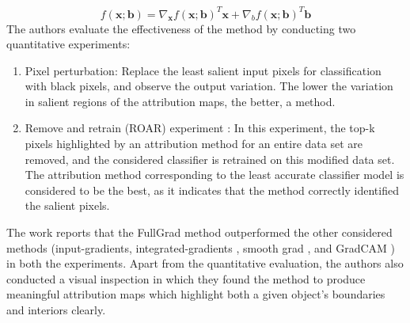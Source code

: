 \documentclass[../report.tex]{subfiles}
\begin{document}
\begin{equation*}
	f(\mathbf{x} ; \mathbf{b})=\nabla_{\mathbf{x}} f(\mathbf{x} ; \mathbf{b})^T \mathbf{x}+\nabla_b f(\mathbf{x} ; \mathbf{b})^T \mathbf{b}
\end{equation*}
The authors evaluate the effectiveness of the method by conducting two quantitative experiments:
\begin{enumerate}
	\item Pixel perturbation: Replace the least salient input pixels for classification with black pixels, and observe the output variation. The lower the variation in salient regions of the attribution maps, the better, a method.
	\item  Remove and retrain (ROAR) experiment \cite{hooker2018evaluating}: In this experiment, the top-k pixels highlighted by an attribution method for an entire data set are removed, and the considered classifier is retrained on this modified data set. The attribution method corresponding to the least accurate classifier model is considered to be the best, as it indicates that the method correctly identified the salient pixels.
\end{enumerate}

The work reports that the FullGrad method outperformed the other considered methods (input-gradients\cite{shrikumar2017learning}, integrated-gradients \cite{sundararajan2017axiomatic}, smooth grad \cite{smilkov2017smoothgrad}, and GradCAM \cite{selvaraju2017grad}) in both the experiments. Apart from the quantitative evaluation, the authors also conducted a visual inspection in which they found the method to produce meaningful attribution maps which highlight both a given object’s boundaries and interiors clearly.
\end{document}
